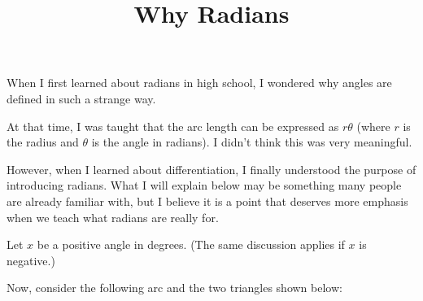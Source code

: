 \documentclass[letterpaper, 12pt]{article}
\title{Why Radians}
\date{}
\theoremstyle{custom}
\begin{document}
\maketitle
When I first learned about radians in high school, I wondered why angles are defined in such a strange way.  

At that time, I was taught that the arc length can be expressed as $r\theta$ (where $r$ is the radius and $\theta$ is the angle in radians).  
I didn't think this was very meaningful.  

However, when I learned about differentiation, I finally understood the purpose of introducing radians.  
What I will explain below may be something many people are already familiar with,  
but I believe it is a point that deserves more emphasis when we teach what radians are really for.

Let $x$ be a positive angle in degrees.  
(The same discussion applies if $x$ is negative.)

Now, consider the following arc and the two triangles shown below:
\begin{center}
\end{center}
\end{document}
